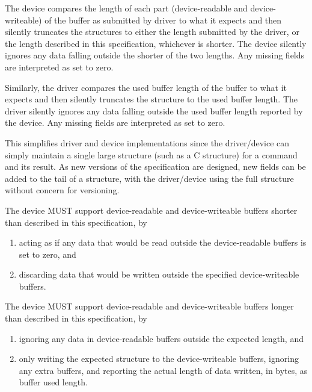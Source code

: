 The device compares the length of each part (device-readable and
device-writeable) of the buffer as submitted by driver to what it
expects and then silently truncates the structures to either the
length submitted by the driver, or the length described in this
specification, whichever is shorter.  The device silently ignores
any data falling outside the shorter of the two lengths. Any
missing fields are interpreted as set to zero.

Similarly, the driver compares the used buffer length
of the buffer to what it expects and then silently
truncates the structure to the used buffer length.
The driver silently ignores any data falling outside
the used buffer length reported by the device.  Any missing
fields are interpreted as set to zero.

This simplifies driver and device implementations since the
driver/device can simply maintain a single large structure (such
as a C structure) for a command and its result. As new versions
of the specification are designed, new fields can be added to the
tail of a structure, with the driver/device using the full
structure without concern for versioning.


The device MUST support device-readable and device-writeable buffers
shorter than described in this specification, by
\begin{enumerate}
\item acting as if any data that would be read outside the
device-readable buffers is set to zero, and
\item discarding data that would be written outside the
specified device-writeable buffers.
\end{enumerate}

The device MUST support device-readable and device-writeable buffers
longer than described in this specification, by
\begin{enumerate}
\item ignoring any data in device-readable buffers outside
the expected length, and
\item only writing the expected structure to the device-writeable
buffers, ignoring any extra buffers, and reporting the
actual length of data written, in bytes,
as buffer used length.
\end{enumerate}

